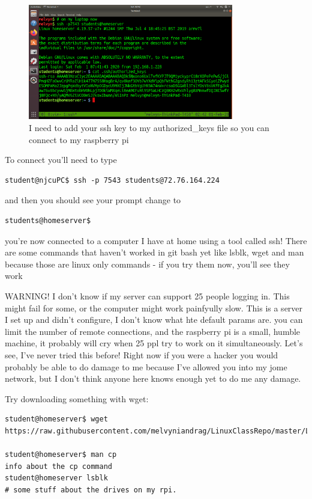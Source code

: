 \documentclass[10pt]{article}
\begin{document}
\begin{figure}[h]
\centering
	\includegraphics[width=0.8\textwidth]{Images/sshToHomeserver.png}
	\caption{I need to add your ssh key to my authorized\_keys file so you can
connect to my raspberry pi}
	\label{fig:firstssh}
\end{figure}


To connect you'll need to type

\begin{lstlisting}[style=term]
student@njcuPC$ ssh -p 7543 students@72.76.164.224
\end{lstlisting}

and then you should see your prompt change to 

\begin{lstlisting}[style=term]
students@homeserver$
\end{lstlisting}

you're now connected to a computer I have at home using a tool called ssh! There
are some commands that haven't worked in git bash yet like lsblk, wget and man
because those are linux only commands - if you try them now, you'll see they
work

{\LARGE WARNING! I don't know if my server can support 25 people logging in.
This might fail for some, or the computer might work painfyully slow. This is a
server I set up and didn't configure, I don't know what hte default params are.
you can limit the number of remote connections, and the raspberry pi is a small,
humble machine, it probably will cry when 25 ppl try to work on it
simultaneously. Let's see, I've never tried this before! Right now if you were a
hacker you would probably be able to do damage to me because I've allowed you
into my jome network, but I don't think anyone here knows enough yet to do me
any damage.}

Try downloading something with wget:

\begin{lstlisting}
student@homeserver$ wget
https://raw.githubusercontent.com/melvyniandrag/LinuxClassRepo/master/Lectures/Week03_SSHandMoreBash/a.txt

student@homeserver$ man cp
info about the cp command
student@homeserver lsblk
# some stuff about the drives on my rpi.
\end{lstlisting}
\end{document}
